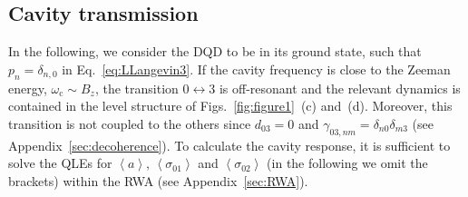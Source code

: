 \documentclass[twocolumn,english,aps,prl,preprint,reprint,showpacs,longbibliography,showkeys]{revtex4-1}
\begin{document}
\subsection{Cavity transmission}
\label{subsec:trasmission}


In the following, we consider the DQD to be in its ground state, such that $p_n=\delta_{n,0}$ in Eq.~\eqref{eq:LLangevin3}. If the cavity frequency is close to the Zeeman energy, $\omega_{\mathrm{c}}\sim B_z$, the transition $0\leftrightarrow 3$ is off-resonant and the relevant dynamics is contained in the level structure of Figs.~\ref{fig:figure1}~(c) and~(d). Moreover, this transition is not coupled to the others since $d_{03}=0$ and $\gamma_{03,nm}=\delta_{n0}\delta_{m3}$ (see Appendix~\ref{sec:decoherence}). To calculate  the cavity response, it is sufficient to solve the  QLEs for $\left\langle a\right\rangle$, $\left\langle\sigma_{01}\right\rangle$ and $\left\langle\sigma_{02}\right\rangle$ (in the following we omit the brackets) within the RWA (see Appendix~\ref{sec:RWA}).
\end{document}
